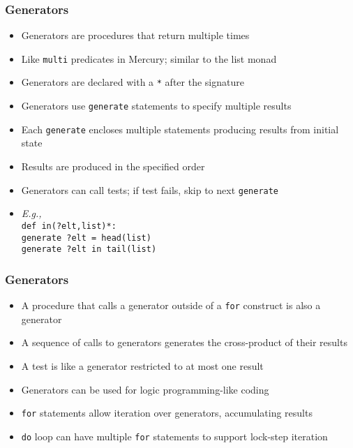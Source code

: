 \documentclass[12pt]{beamer}
\begin{document}
\begin{frame}
\frametitle{Generators}
\begin{itemize}
\item Generators are procedures that return multiple times
\item Like \texttt{multi} predicates in Mercury; similar to the list monad
\item Generators are declared with a \texttt{*} after the signature
\item Generators use \texttt{generate} statements to specify
  multiple results
\item Each \texttt{generate} encloses multiple statements producing
  results from initial state
\item Results are produced in the specified order
\item Generators can call tests; if test fails, skip to next \texttt{generate}
\item \emph{E.g.,} \\
  \hspace*{2em}\texttt{def in(?elt,list)*:} \\
  \hspace*{4em}\texttt{generate ?elt = head(list)} \\
  \hspace*{4em}\texttt{generate ?elt in tail(list)} \\

\end{itemize}
\end{frame}


\begin{frame}
\frametitle{Generators}
\begin{itemize}
\item A procedure that calls a generator outside of a \texttt{for}
  construct is also a generator
\item A sequence of calls to generators generates the cross-product of
  their results
\item A test is like a generator restricted to at most one result
\item Generators can be used for logic programming-like coding
\item \texttt{for} statements allow iteration over generators,
  accumulating results
\item \texttt{do} loop can have multiple \texttt{for} statements to
  support lock-step iteration
\end{itemize}
\end{frame}
\end{document}
